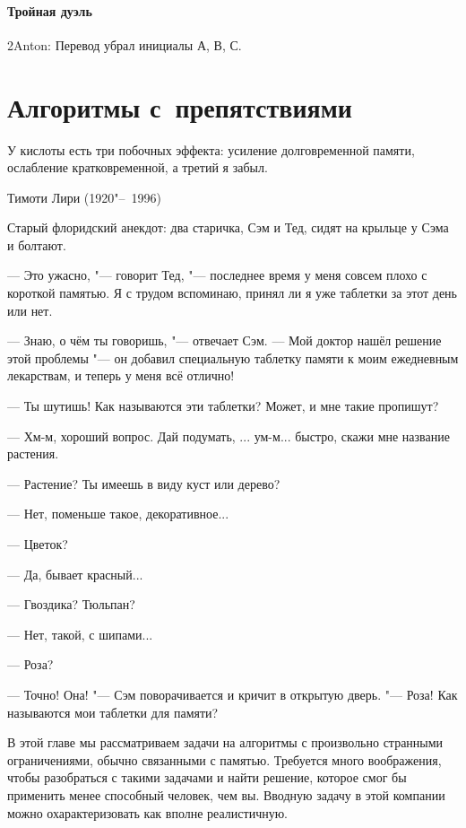 \documentclass[twoside]{book}
\begin{document}
\subsubsection{Тройная дуэль}
2Anton: Перевод убрал инициалы А, В, С.




\chapter{Алгоритмы с~препятствиями}

\setlength{\epigraphwidth}{.6\textwidth}
\epigraph{У кислоты есть три побочных эффекта: усиление долговременной памяти, ослабление кратковременной, а третий я забыл.\vspace{1ex}}{Тимоти Лири (1920"--~1996)}

Старый флоридский анекдот:
два старичка, Сэм и Тед, сидят на крыльце у Сэма и болтают.

--- Это ужасно, "--- говорит Тед, "--- последнее время у меня совсем плохо с короткой памятью.
Я с трудом вспоминаю, принял ли я уже таблетки за этот день или нет.

--- Знаю, о чём ты говоришь, "--- отвечает Сэм.
--- Мой доктор нашёл решение этой проблемы "--- он добавил специальную таблетку памяти к моим ежедневным лекарствам, и теперь у меня всё отлично!

--- Ты шутишь! Как называются эти таблетки? Может, и мне такие пропишут?

--- Хм-м, хороший вопрос.
Дай подумать, ... ум-м... быстро, скажи мне название растения.

--- Растение? Ты имеешь в виду куст или дерево?

--- Нет, поменьше такое, декоративное...

--- Цветок?

--- Да, бывает красный...

--- Гвоздика? Тюльпан?

--- Нет, такой, с шипами...

--- Роза?

--- Точно! Она! "--- Сэм поворачивается и кричит в открытую дверь. "--- Роза! Как называются мои таблетки для памяти?

\medskip

В этой главе мы рассматриваем задачи на алгоритмы с произвольно странными ограничениями, обычно связанными с памятью.
Требуется много воображения, чтобы разобраться с такими задачами и найти решение, которое смог бы применить менее способный человек, чем вы.
Вводную задачу в этой компании можно охарактеризовать как вполне реалистичную.
\end{document}
